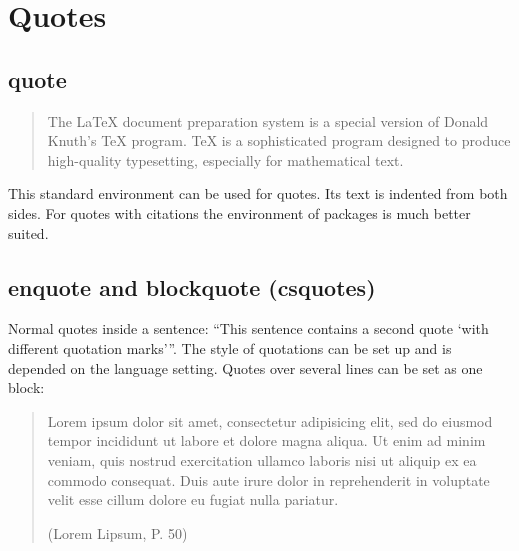 %

%
\section{Quotes}

\subsection{quote}

\begin{filecontents*}{\democodefile}
\begin{quote}
The \LaTeX{} document preparation system is a special version of Donald
Knuth's \TeX{} program. \TeX{} is a sophisticated program designed to 
produce high-quality typesetting, especially for mathematical text.
\end{quote}
\end{filecontents*}

This standard environment can be used for quotes. Its text is indented from both sides. For quotes with citations the  environment of packages  is much better suited.

%

\subsection{enquote and blockquote (csquotes)}

\begin{filecontents*}{\democodefile}
Normal quotes inside a sentence: \enquote{This sentence contains a second
quote \enquote{with different quotation marks}}. The style of
quotations can be set up and is depended on the language setting. 
Quotes over several lines can be set as one block: \blockquote[(Lorem Lipsum,
P. 50)]{Lorem ipsum dolor sit amet, consectetur adipisicing elit, sed do
eiusmod tempor incididunt ut labore et dolore magna aliqua. Ut enim ad minim
veniam, quis nostrud exercitation ullamco laboris nisi ut aliquip ex ea
commodo consequat. Duis aute irure dolor in reprehenderit in voluptate velit
esse cillum dolore eu fugiat nulla pariatur.}
\end{filecontents*}

